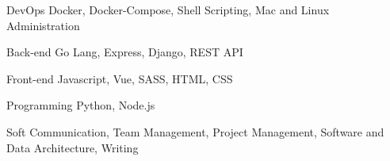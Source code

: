 

\begin{cvskills}

  \cvskill
    {DevOps} %
    {Docker, Docker-Compose, Shell Scripting, Mac and Linux Administration} %

  \cvskill
    {Back-end} %
    {Go Lang, Express, Django, REST API} %

  \cvskill
    {Front-end} %
    {Javascript, Vue, SASS, HTML, CSS} %

  \cvskill
    {Programming} %
    {Python, Node.js} %

  \cvskill
    {Soft} %
    {Communication, Team Management, Project Management, Software and Data Architecture, Writing} %

\end{cvskills}
